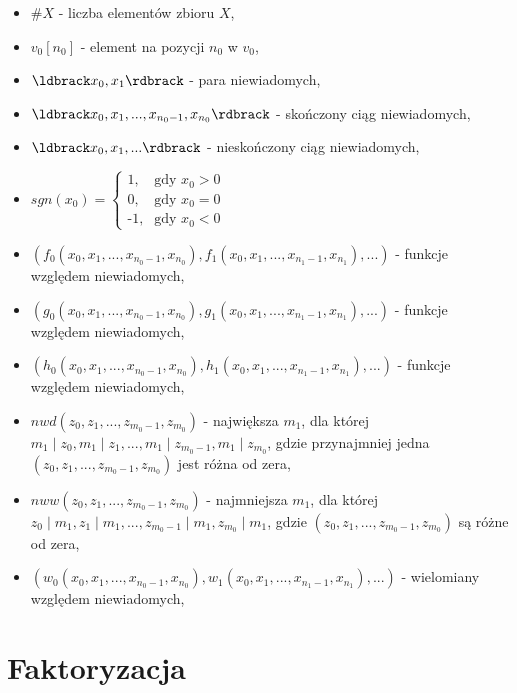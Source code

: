 \begin{itemize}[nosep, leftmargin=*]
\item $\#X$ - liczba elementów zbioru $X$,
\item $v_0[n_0]$ - element na pozycji $n_0$ w $v_0$,
\item $\ldbrack x_0, x_1 \rdbrack$ - para niewiadomych,
\item $\ldbrack x_0, x_1, ..., x_{n_0 - 1}, x_{n_0} \rdbrack$ - skończony ciąg niewiadomych,
\item $\ldbrack x_0, x_1, ...\rdbrack$ - nieskończony ciąg niewiadomych,
\item $sgn(x_0) = \begin{cases} \mbox{1,} & \mbox{gdy } x_0 > 0 \\ \mbox{0,} & \mbox{gdy } x_0 = 0 \\ \mbox{-1,} & \mbox{gdy } x_0 < 0 \end{cases}$
\item $(f_0(x_0, x_1, ..., x_{n_0 - 1}, x_{n_0}), f_1(x_0, x_1, ..., x_{n_1 - 1}, x_{n_1}), ...)$ - funkcje względem niewiadomych,
\item $(g_0(x_0, x_1, ..., x_{n_0 - 1}, x_{n_0}), g_1(x_0, x_1, ..., x_{n_1 - 1}, x_{n_1}), ...)$ - funkcje względem niewiadomych,
\item $(h_0(x_0, x_1, ..., x_{n_0 - 1}, x_{n_0}), h_1(x_0, x_1, ..., x_{n_1 - 1}, x_{n_1}), ...)$ - funkcje względem niewiadomych,
\item $nwd(z_0, z_1, ..., z_{m_0 - 1}, z_{m_0})$ - największa $m_1$, dla której $m_1 \mid z_0, m_1 \mid z_1, ..., m_1 \mid z_{m_0 - 1}, m_1 \mid z_{m_0}$, gdzie przynajmniej jedna $(z_0, z_1, ..., z_{m_0 - 1}, z_{m_0})$ jest różna od zera,
\item $nww(z_0, z_1, ..., z_{m_0 - 1}, z_{m_0})$ - najmniejsza $m_1$, dla której $z_0 \mid m_1, z_1 \mid m_1, ..., z_{m_0 - 1} \mid m_1, z_{m_0} \mid m_1$, gdzie $(z_0, z_1, ..., z_{m_0 - 1}, z_{m_0})$ są różne od zera,
\item $(w_0(x_0, x_1, ..., x_{n_0 - 1}, x_{n_0}), w_1(x_0, x_1, ..., x_{n_1 - 1}, x_{n_1}), ...)$ - wielomiany względem niewiadomych,
\end{itemize}
\newpage
\thispagestyle{empty}

\chapter{Faktoryzacja}

